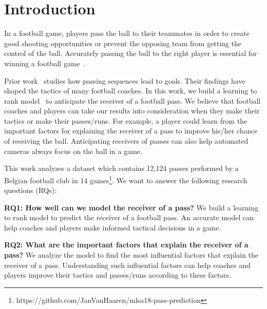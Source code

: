 \section{Introduction} \label{intro}
In a football game, players pass the ball to their teammates in order to create good shooting opportunities or prevent the opposing team from getting the control of the ball.
Accurately passing the ball to the right player is essential for winning a football game~\cite{Ali2011Measuring,Hughes2005Analysis}.

Prior work~\cite{reep1968skill,Hughes2005Analysis} studies how passing sequences lead to goals. Their findings have shaped the tactics of many football coaches.
In this work, we build a learning to rank model~\cite{liu2009learning} to anticipate the receiver of a football pass.
We believe that football coaches and players can take our results into consideration when they make their tactics or make their passes/runs. 
For example, a player could learn from the important factors for explaining the receiver of a pass to improve his/her chance of receiving the ball. 
Anticipating receivers of passes can also help automated cameras always focus on the ball in a game.

This work analyzes a dataset which contains 12,124 passes performed by a Belgian football club in 14 games\footnote{\label{origin_dataset}https://github.com/JanVanHaaren/mlsa18-pass-prediction}. We want to answer the following research questions (RQs): 

\begin{description}
	
	\item \textbf{RQ1: How well can we model the receiver of a pass?}
	We build a learning to rank model to predict the receiver of a football pass. 
	An accurate model can help coaches and players make informed tactical decisions in a game.
	
	\item \textbf{RQ2: What are the important factors that explain the receiver of a pass?}
	We analyze the model to find the most influential factors that explain the receiver of a pass. Understanding such influential factors can help coaches and players improve their tactics and passes/runs according to these factors.
\end{description}

